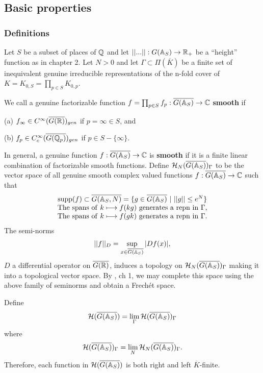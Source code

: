 \subsection{Basic properties}

\subsubsection{Definitions}

Let $S$ be a subset of places of ${\Bbb{Q}}$ and let
$||...||:G({\Bbb{A}}_S)\rightarrow {\Bbb{R}}_+$ be a ``height'' function
as in chapter 2. Let $N>0$ and let
$\Gamma\subset \Pi(\overline{K})$
be a finite set of inequivalent genuine irreducible representations
of the n-fold cover of $K=K_{0,S}=\prod_{p\in S}K_{0,p}$.

We call a genuine factorizable function
$f=\prod_{p\in S}f_p:\overline{G({\Bbb{A}}_S)}\rightarrow {\Bbb{C}}$
{\bf smooth} if

(a) $f_\infty\in C^\infty(\overline{G({\Bbb{R}})})_{gen}$
if $p=\infty \in S$, and

(b) $f_p\in C_c^\infty(\overline{G({\Bbb{Q}}_p)})_{gen}$
if $p\in S-\{\infty\}$.

\noindent
In general, a genuine
function $f:\overline{G({\Bbb{A}}_S)}\rightarrow {\Bbb{C}}$
is {\bf smooth} if it is a finite linear combination of factorizable smooth
functions. Define
${\cal{H}}_N(\overline{G({\Bbb{A}}_S)})_\Gamma$
to be the vector space of
all genuine smooth complex valued functions
$f:\overline{G({\Bbb{A}}_S)}\rightarrow {\Bbb{C}}$
such that
\begin{equation}
\begin{array}{c}
{\rm supp}(f)\subset \overline{G({\Bbb{A}}_S,N)}
=\{ g\in \overline{G({\Bbb{A}}_S)}\ |\ ||g||\leq e^N\}\\
{\rm The \ spans\ of\ }
k\longmapsto f(kg){\rm \ generates\ a \ repn\ in\ }\Gamma,\\
{\rm The \ spans\ of\ }
k\longmapsto f(gk){\rm \ generates\ a \ repn\ in\ }\Gamma .
\end{array}
\end{equation}
The semi-norms
\[
||f||_D=\sup_{x\in \overline{G({\Bbb{A}}_S)}} |Df(x)|,
\]
$D$ a differential operator on $\overline{G({\Bbb{R}})}$,
induces a topology on
${\cal{H}}_N(\overline{G({\Bbb{A}}_S)})_\Gamma$
making it into a topological
vector space. By \cite{Ru}, ch 1,
we may complete this space using the above
family of seminorms and obtain a Frech\'et space.

Define
\[
{\cal{H}}(\overline{G({\Bbb{A}}_S)})=\lim_{\Gamma}
{\cal{H}}(\overline{G({\Bbb{A}}_S)})_\Gamma
\]
where
\[
{\cal{H}}(\overline{G({\Bbb{A}}_S)})_\Gamma =\lim_{N}
{\cal{H}}_N(\overline{G({\Bbb{A}}_S)})_\Gamma .
\]
Therefore, each function in
${\cal{H}}(\overline{G({\Bbb{A}}_S)})$
is both right and left $\overline{K}$-finite.

